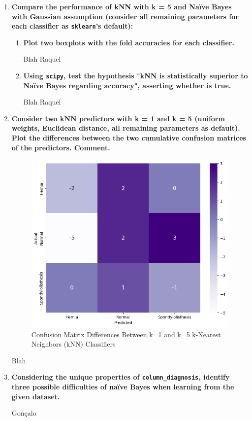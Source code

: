 \documentclass[12pt]{article}
\begin{document}
\begin{enumerate}[leftmargin=\labelsep]
    \item \textbf{Compare the performance of kNN with k = 5 and Naïve Bayes with Gaussian assumption
          (consider all remaining parameters for each classifier as \texttt{sklearn}'s default):}
          \begin{enumerate}
          \item \textbf{Plot two boxplots with the fold accuracies for each classifier.}

          \vskip 0.3cm
          Blah
          Raquel

          \item \textbf{Using \texttt{scipy}, test the hypothesis "kNN is statistically superior to Naïve Bayes regarding
                accuracy", asserting whether is true.}

          \vskip 0.3cm
          Blah
          Raquel
          \end{enumerate}

    \item \textbf{Consider two kNN predictors with k = 1 and k = 5 (uniform weights, Euclidean distance,
          all remaining parameters as default). Plot the differences between the two cumulative confusion
          matrices of the predictors. Comment.}

          \vskip 0.3cm
          

          \begin{figure}[H]
              \centering
              \includegraphics[width=13cm]{./assets/cummulative_heatmap_ex2_PartII.png}
              \caption{Confusion Matrix Differences Between k=1 and k=5 k-Nearest Neighbors (kNN) Classifiers}
              \label{fig:PartII-ex2}
          \end{figure}

          Blah %

    \item \textbf{Considering the unique properties of \texttt{column\_diagnosis}, identify three possible difficulties
          of naïve Bayes when learning from the given dataset.}

          \vskip 0.3cm
          Gonçalo
\end{enumerate}
\end{document}
